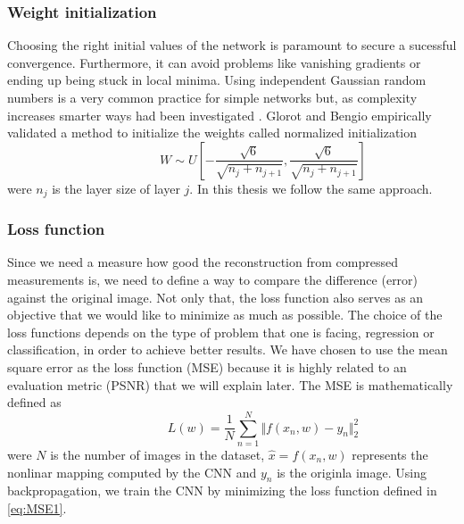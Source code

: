 \subsubsection{Weight initialization}
Choosing the right initial values of the network is paramount to secure a sucessful convergence. Furthermore, it can avoid problems like vanishing gradients or ending up being stuck in local minima. Using independent Gaussian random numbers is a very common practice for simple networks but, as complexity increases smarter ways had been investigated \cite{glorot2010understanding}. Glorot and Bengio empirically validated a method to initialize the weights called normalized initialization 
\begin{equation} \label{eq:Initw1}
\hspace{3em} \hspace{3em} \hspace{3em} W \sim U [ - \frac{\sqrt{6}}{\sqrt{n_j + n_{j+1}}}, \frac{\sqrt{6}}{\sqrt{n_j + n_{j+1}}} ] \enspace \enspace \hspace{3em}
\end{equation}  
were $n_j$ is the layer size of layer $j$. In this thesis we follow the same approach.   

\subsubsection{Loss function}
Since we need a measure how good the reconstruction from compressed measurements is, we need to define a way to compare the difference (error) against the original image. Not only that, the loss function also serves as an objective that we would like to minimize as much as possible. The choice of the loss functions depends on the type of problem that one is facing, regression or classification, in order to achieve better results. We have chosen to use the mean square error as the loss function (MSE) because it is highly related to an evaluation metric (PSNR) that we will explain later. The MSE is mathematically defined as 
\begin{equation} \label{eq:MSE1}
\hspace{3em} \hspace{3em} \hspace{3em} L (w) = \frac{1}{N} \sum\limits_{n=1}^N \Vert f(x_n,w) - y_n\Vert_{2}^2 \enspace \enspace \hspace{3em}
\end{equation} 
were $N$ is the number of images in the dataset, $\hat{x} = f(x_n,w)$ represents the nonlinar mapping computed by the CNN and $y_n$ is the originla image. Using backpropagation, we train the CNN by minimizing the loss function defined in \ref{eq:MSE1}.  

